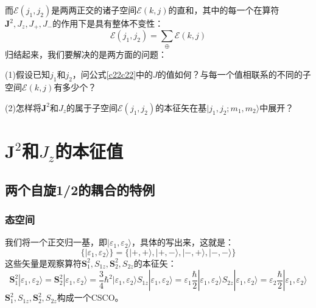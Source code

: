 \documentclass[]{article}
\begin{document}
而$\mathscr{E}(j_1,j_2)$是两两正交的诸子空间$\mathscr{E}(k,j)$的直和，其中的每一个在算符$\boldsymbol{J}^2,J_z,J_+,J_-$的作用下是具有整体不变性：
\begin{equation}
	\mathscr{E}(j_1,j_2)=\sum\limits_{\oplus}\mathscr{E}(k,j)
	\label{c22c22}
\end{equation}
归结起来，我们要解决的是两方面的问题：\par 
(1)假设已知$j_1$和$j_2$，问公式\eqref{c22c22}中的$J$的值如何？与每一个值相联系的不同的子空间$\mathscr{E}(k,j)$有多少个？\par 
(2)怎样将$\boldsymbol{J}^2$和$J_z$的属于子空间$\mathscr{E}(j_1,j_2)$的本征矢在基${|j_1,j_2;m_1,m_2\rangle}$中展开？
\section{$\boldsymbol{J}^2$和$J_z$的本征值}
\subsection{两个自旋1/2的耦合的特例}
\subsubsection{态空间}
我们将一个正交归一基，即${|\varepsilon_1,\varepsilon_2\rangle}$，具体的写出来，这就是：
\begin{equation}
	\{|\varepsilon_1,\varepsilon_2\rangle\}=\{|+,+\rangle,|+,-\rangle,|-,+\rangle,|-,-\rangle\}
	\label{b1b1}
\end{equation}
这些矢量是观察算符$\boldsymbol{S}_1^2,S_{1z},\boldsymbol{S}_2^2,S_{2z}$的本征矢：
\begin{subequations}
	\begin{equation}
		\boldsymbol{S}_1^2|\varepsilon_1,\varepsilon_2\rangle=\boldsymbol{S}_2^2|\varepsilon_1,\varepsilon_2\rangle=\dfrac{3}{4}\hbar^2|\varepsilon_1,\varepsilon_2\rangle
	\end{equation}
	\begin{equation}
		S_{1z}|\varepsilon_1,\varepsilon_2\rangle=\varepsilon_1\dfrac{\hbar}{2}|\varepsilon_1,\varepsilon_2\rangle
		\label{b2bb2b}
	\end{equation}
	\begin{equation}
		S_{2z}|\varepsilon_1,\varepsilon_2\rangle=\varepsilon_2\dfrac{\hbar}{2}|\varepsilon_1,\varepsilon_2\rangle
		\label{b2cb2c}
	\end{equation}
\end{subequations}
$\boldsymbol{S}_1^2,S_{1z},\boldsymbol{S}_2^2,S_{2z}$构成一个CSCO。
\end{document}
